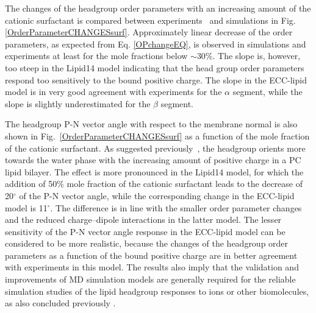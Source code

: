 \documentclass[aip,jcp,twocolumn]{revtex4}
\begin{document}
The changes of the headgroup order parameters with an increasing amount of 
the cationic surfactant is compared between experiments~\cite{scherer89} and
simulations in Fig. \ref{OrderParameterCHANGESsurf}.
Approximately linear decrease of the order parameters, as expected from Eq. \ref{OPchangeEQ},
is observed in simulations and experiments at least for the mole fractions
below $\sim$30\%. The slope is, however, too steep in the Lipid14 model indicating that 
the head group order parameters respond too sensitively to the bound positive charge.
The slope in the ECC-lipid model is in very good agreement with experiments
for the $\alpha$ segment, while the slope is slightly
underestimated for the $\beta$ segment.

The headgroup P-N vector angle with respect to the membrane normal
is also shown in Fig.~\ref{OrderParameterCHANGESsurf}
as a function of the mole fraction of the cationic surfactant.
As suggested previously~\cite{seelig87}, the headgroup orients
more towards the water phase with the increasing amount of positive
charge in a PC lipid bilayer. The effect is more pronounced in the
Lipid14 model, for which the addition of 50\% mole fraction of the cationic
surfactant leads to the decrease of 20$^{\circ}$ of the P-N vector angle,
while the corresponding change in the ECC-lipid model is 11$^{\circ}$.
The difference is in line with the smaller order parameter 
changes and the reduced charge--dipole interactions in the latter model.
The lesser sensitivity of the P-N vector angle response in the ECC-lipid
model can be considered to be more realistic, because the changes of the headgroup
order parameters as a function of the bound positive charge
are in better agreement with experiments in this model.
The results also imply that the validation and improvements of MD simulation
models are generally required for the reliable simulation studies of the
lipid headgroup responses to ions or other biomolecules, as also concluded
previously \cite{botan15}.


%
%
\end{document}
